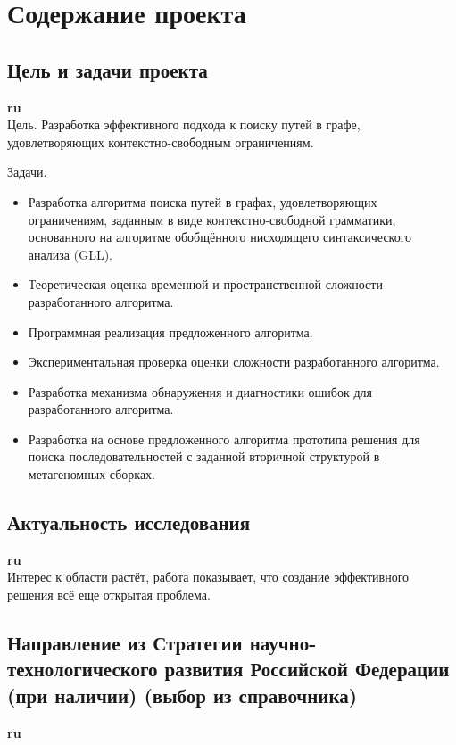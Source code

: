 \documentclass[12pt]{article}  %
\theoremstyle{remark}
\begin{document}
\section{Содержание проекта}

\subsection{Цель и задачи проекта}

\textbf{ru}\\
Цель.
Разработка эффективного подхода к поиску путей в графе, удовлетворяющих контекстно-свободным ограничениям.

Задачи.
\begin{itemize}
\item Разработка алгоритма поиска путей в графах, удовлетворяющих ограничениям, заданным в виде контекстно-свободной грамматики, основанного на алгоритме обобщённого нисходящего синтаксического анализа (GLL).
\item Теоретическая оценка временной и пространственной сложности разработанного алгоритма.
\item Программная реализация предложенного алгоритма.
\item Экспериментальная проверка оценки сложности разработанного алгоритма.
\item Разработка механизма обнаружения и диагностики ошибок для разработанного алгоритма.
\item Разработка на основе предложенного алгоритма прототипа решения для поиска последовательностей с заданной вторичной структурой в метагеномных сборках.
\end{itemize}

\subsection{Актуальность исследования}

\textbf{ru}\\
Интерес к области растёт, работа показывает, что создание эффективного решения всё еще открытая проблема.

\subsection{Направление из Стратегии научно-технологического развития Российской Федерации (при наличии) (выбор из справочника)}

\textbf{ru}\\
\end{document}
